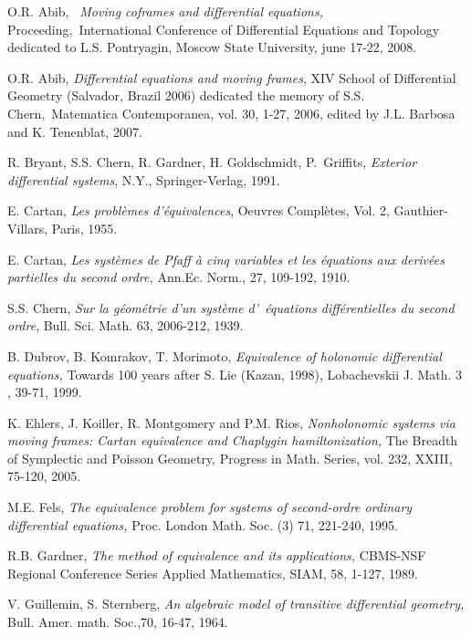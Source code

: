 \documentclass{amsproc}
\theoremstyle{remark}
\numberwithin{equation}{section}
\begin{document}
\begin{thebibliography}{99}
 O.R. Abib, \textit{\ Moving coframes and differential equations, }Proceeding,\textit{\ }International Conference of Differential Equations and
Topology dedicated to L.S. Pontryagin, Moscow State University, june 17-22,
2008.

 O.R. Abib, \textit{Differential equations and moving frames}, XIV
School of Differential Geometry (Salvador, Brazil 2006) dedicated the memory of S.S. Chern,\
Matematica Contemporanea, vol. 30, 1-27, 2006, edited by J.L. Barbosa and K.
Tenenblat, 2007.

 R. Bryant, S.S. Chern, R. Gardner, H. Goldschmidt, P.\ Griffits, 
\textit{Exterior differential systems}, N.Y., Springer-Verlag, 1991.

 E. Cartan, \textit{Les probl\`{e}mes d'\'{e}quivalences}, Oeuvres
Compl\`{e}tes, Vol. 2, Gauthier-Villars, Paris, 1955.

 E. Cartan, \textit{Les syst\`{e}mes de Pfaff \`{a} cinq variables
et les \'{e}quations aux deriv\'{e}es partielles du second ordre, }Ann.Ec.
Norm., 27, 109-192, 1910.

 S.S. Chern, \textit{Sur la g\'{e}om\'{e}trie d'un syst\`{e}me d'\ 
\'{e}quations diff\'{e}rentielles du second ordre}, Bull. Sci. Math. 63,
2006-212, 1939.

 B. Dubrov, B. Komrakov, T. Morimoto, \textit{Equivalence of
holonomic differential equations, }Towards 100 years after S. Lie (Kazan,
1998), Lobachevskii J. Math. 3 , 39-71, 1999.

 K. Ehlers, J. Koiller, R. Montgomery and P.M. Rios, \textit{Nonholonomic systems via moving frames: Cartan equivalence and Chaplygin
hamiltonization, }The Breadth of Symplectic and Poisson Geometry, Progress
in Math. Series, vol. 232, XXIII, 75-120, 2005.

 M.E. Fels, \textit{The equivalence problem for systems of
second-ordre ordinary differential equations, }Proc. London Math. Soc. (3)
71, 221-240, 1995.

 R.B. Gardner, \textit{The method of equivalence and its
applications, }CBMS-NSF Regional Conference Series Applied Mathematics,
SIAM, 58, 1-127, 1989.

 V. Guillemin, S. Sternberg, \textit{An algebraic model of
transitive differential geometry, }Bull. Amer. math. Soc.,70, 16-47, 1964.


\end{thebibliography}
\end{document}
